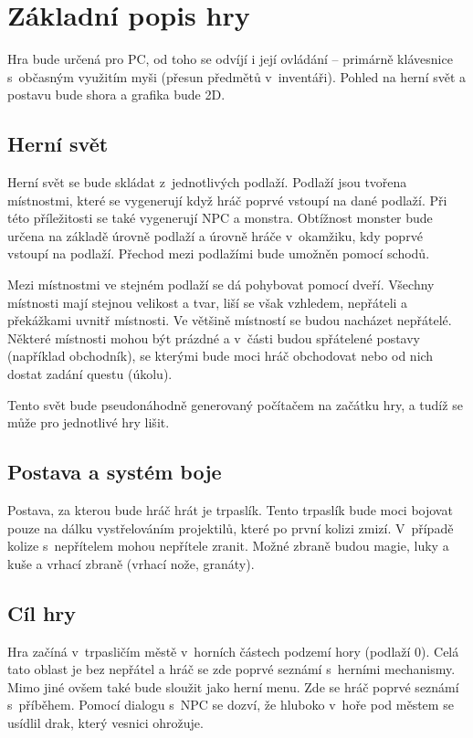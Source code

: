 \documentclass[12pt,a4paper]{article}
\begin{document}




\section{Základní popis hry}
Hra bude určená pro PC, od toho se odvíjí i její ovládání -- primárně klávesnice
s~občasným využitím myši (přesun předmětů v~inventáři). Pohled na herní svět a
postavu bude shora a grafika bude 2D.

\subsection{Herní svět}
Herní svět se bude skládat z~jednotlivých podlaží. Podlaží jsou tvořena
místnostmi, které se vygenerují když hráč poprvé vstoupí na dané podlaží. Při
této příležitosti se také vygenerují NPC a monstra. Obtížnost monster bude
určena na základě úrovně podlaží a úrovně hráče v~okamžiku, kdy poprvé vstoupí
na podlaží. Přechod mezi podlažími bude umožněn pomocí schodů.

Mezi místnostmi ve stejném podlaží se dá pohybovat pomocí dveří. Všechny
místnosti mají stejnou velikost a tvar, liší se však vzhledem, nepřáteli a
překážkami uvnitř místnosti. Ve většině místností se budou nacházet nepřátelé.
Některé místnosti mohou být prázdné a v~části budou spřátelené postavy (například
obchodník), se kterými bude moci hráč obchodovat nebo od nich dostat zadání
questu (úkolu).

Tento svět bude pseudonáhodně generovaný počítačem na začátku hry, a tudíž se
může pro jednotlivé hry lišit.

\subsection{Postava a systém boje}
Postava, za kterou bude hráč hrát je trpaslík. Tento trpaslík bude moci bojovat
pouze na dálku vystřelováním projektilů, které po první kolizi zmizí. V~případě
kolize s~nepřítelem mohou nepřítele zranit. Možné zbraně budou magie, luky a
kuše a vrhací zbraně (vrhací nože, granáty).

\subsection{Cíl hry}
Hra začíná v~trpasličím městě v~horních částech podzemí hory (podlaží 0).
Celá tato oblast je bez nepřátel a hráč se zde poprvé seznámí s~herními
mechanismy.  Mimo  jiné ovšem také bude sloužit jako herní menu.
Zde se hráč poprvé seznámí s~příběhem. Pomocí dialogu s~NPC se dozví,
že hluboko v~hoře pod městem se usídlil drak, který vesnici ohrožuje.
\end{document}
